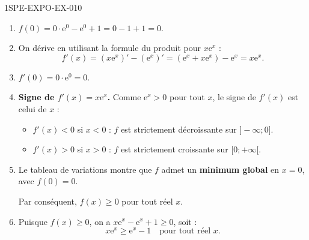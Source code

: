 \begin{corrige}{1SPE-EXPO-EX-010}
\begin{enumerate}
\item $f(0) = 0 \cdot \mathrm{e}^0 - \mathrm{e}^0 + 1 = 0 - 1 + 1 = 0$.

\item On dérive en utilisant la formule du produit pour $x\mathrm{e}^x$ :
\[f'(x) = (x\mathrm{e}^x)' - (\mathrm{e}^x)' = (\mathrm{e}^x + x\mathrm{e}^x) - \mathrm{e}^x = x\mathrm{e}^x.\]

\item $f'(0) = 0 \cdot \mathrm{e}^0 = 0$.

\item \textbf{Signe de $f'(x) = x\mathrm{e}^x$.} Comme $\mathrm{e}^x > 0$ pour tout $x$, le signe de $f'(x)$ est celui de $x$ :
\begin{itemize}
\item $f'(x) < 0$ si $x < 0$ : $f$ est strictement décroissante sur $]-\infty ; 0]$.
\item $f'(x) > 0$ si $x > 0$ : $f$ est strictement croissante sur $[0 ; +\infty[$.
\end{itemize}

\item Le tableau de variations montre que $f$ admet un \textbf{minimum global} en $x = 0$, avec $f(0) = 0$.

Par conséquent, $f(x) \geqslant 0$ pour tout réel $x$.

\item Puisque $f(x) \geqslant 0$, on a $x\mathrm{e}^x - \mathrm{e}^x + 1 \geqslant 0$, soit :
\[x\mathrm{e}^x \geqslant \mathrm{e}^x - 1 \quad \text{pour tout réel } x.\]
\end{enumerate}
\end{corrige}
